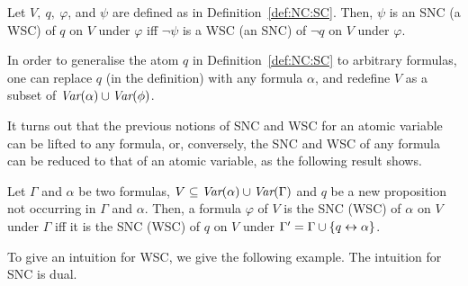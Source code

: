 \documentclass[twoside,11pt]{article}
\begin{document}
	\begin{proposition}[Dual]\label{dual}
		Let $V,\ q,\ \varphi$, and $\psi$ are defined as in Definition~\ref{def:NC:SC}.
		Then, $\psi$ is an SNC (a WSC) of $q$ on $V$ under $\varphi$ iff $\neg \psi$ is a WSC (an SNC)
		of $\neg q$ on $V$ under $\varphi$.
	\end{proposition}
	
	
	
	In order to generalise the atom $q$ in Definition~\ref{def:NC:SC} to arbitrary formulas, one can replace $q$ (in the definition) with any formula $\alpha$, and redefine  $V$ as a subset of $\textit{Var}(\alpha) \cup \textit{Var}(\phi)$.
	
	It turns out that the previous notions of SNC and WSC for an atomic variable can be lifted to any formula, or, conversely, the SNC and WSC of any formula can be reduced to that of an atomic variable, as the following result shows.
	\begin{proposition}\label{formulaNS_to_p}
		Let $\Gamma$ and $\alpha$ be two formulas, $V \subseteq \textit{Var}(\alpha) \cup \textit{Var}(\Gamma)$  and $q$ be a new proposition not occurring in $\Gamma$ and $\alpha$.
		Then, a formula $\varphi$ of $V$ is the SNC (WSC) of $\alpha$ on $V$ under  $\Gamma$ iff it is the SNC (WSC) of $q$ on $V$ under $\Gamma' = \Gamma \cup \{q \leftrightarrow \alpha\}$.
	\end{proposition}
	
	
	To give an intuition for WSC, we give the following example. The intuition for SNC is dual.
	
\end{document}

